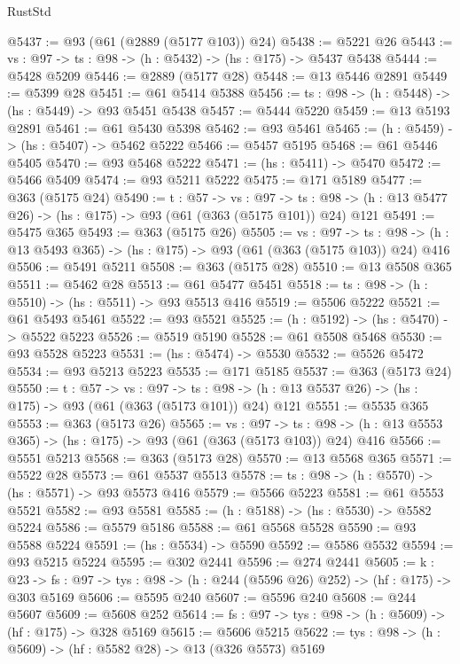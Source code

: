 \begin{lexlean}{RustStd}
\begin{coremodule}
@5437 := @93 (@61 (@2889 (@5177 @103)) @24)
@5438 := @5221 @26
@5443 := {vs : @97} -> {ts : @98} -> (h : @5432) -> (hs : @175) -> @5437 @5438
@5444 := @5428 @5209
@5446 := @2889 (@5177 @28)
@5448 := @13 @5446 @2891
@5449 := @5399 @28
@5451 := @61 @5414 @5388
@5456 := {ts : @98} -> (h : @5448) -> (hs : @5449) -> @93 @5451 @5438
@5457 := @5444 @5220
@5459 := @13 @5193 @2891
@5461 := @61 @5430 @5398
@5462 := @93 @5461
@5465 := (h : @5459) -> (hs : @5407) -> @5462 @5222
@5466 := @5457 @5195
@5468 := @61 @5446 @5405
@5470 := @93 @5468 @5222
@5471 := (hs : @5411) -> @5470
@5472 := @5466 @5409
@5474 := @93 @5211 @5222
@5475 := @171 @5189
@5477 := @363 (@5175 @24)
@5490 := {t : @57} ->
  {vs : @97} ->
  {ts : @98} -> (h : @13 @5477 @26) -> (hs : @175) -> @93 (@61 (@363 (@5175 @101)) @24) @121
@5491 := @5475 @365
@5493 := @363 (@5175 @26)
@5505 := {vs : @97} ->
  {ts : @98} -> (h : @13 @5493 @365) -> (hs : @175) -> @93 (@61 (@363 (@5175 @103)) @24) @416
@5506 := @5491 @5211
@5508 := @363 (@5175 @28)
@5510 := @13 @5508 @365
@5511 := @5462 @28
@5513 := @61 @5477 @5451
@5518 := {ts : @98} -> (h : @5510) -> (hs : @5511) -> @93 @5513 @416
@5519 := @5506 @5222
@5521 := @61 @5493 @5461
@5522 := @93 @5521
@5525 := (h : @5192) -> (hs : @5470) -> @5522 @5223
@5526 := @5519 @5190
@5528 := @61 @5508 @5468
@5530 := @93 @5528 @5223
@5531 := (hs : @5474) -> @5530
@5532 := @5526 @5472
@5534 := @93 @5213 @5223
@5535 := @171 @5185
@5537 := @363 (@5173 @24)
@5550 := {t : @57} ->
  {vs : @97} ->
  {ts : @98} -> (h : @13 @5537 @26) -> (hs : @175) -> @93 (@61 (@363 (@5173 @101)) @24) @121
@5551 := @5535 @365
@5553 := @363 (@5173 @26)
@5565 := {vs : @97} ->
  {ts : @98} -> (h : @13 @5553 @365) -> (hs : @175) -> @93 (@61 (@363 (@5173 @103)) @24) @416
@5566 := @5551 @5213
@5568 := @363 (@5173 @28)
@5570 := @13 @5568 @365
@5571 := @5522 @28
@5573 := @61 @5537 @5513
@5578 := {ts : @98} -> (h : @5570) -> (hs : @5571) -> @93 @5573 @416
@5579 := @5566 @5223
@5581 := @61 @5553 @5521
@5582 := @93 @5581
@5585 := (h : @5188) -> (hs : @5530) -> @5582 @5224
@5586 := @5579 @5186
@5588 := @61 @5568 @5528
@5590 := @93 @5588 @5224
@5591 := (hs : @5534) -> @5590
@5592 := @5586 @5532
@5594 := @93 @5215 @5224
@5595 := @302 @2441
@5596 := @274 @2441
@5605 := {k : @23} ->
  {fs : @97} -> {tys : @98} -> (h : @244 (@5596 @26) @252) -> (hf : @175) -> @303 @5169
@5606 := @5595 @240
@5607 := @5596 @240
@5608 := @244 @5607
@5609 := @5608 @252
@5614 := {fs : @97} -> {tys : @98} -> (h : @5609) -> (hf : @175) -> @328 @5169
@5615 := @5606 @5215
@5622 := {tys : @98} -> (h : @5609) -> (hf : @5582 @28) -> @13 (@326 @5573) @5169

\end{coremodule}
\end{lexlean}
